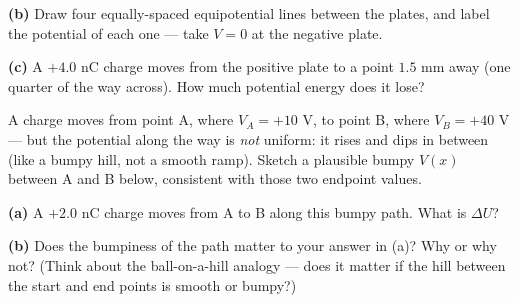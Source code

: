 \documentclass[12pt]{article}
\begin{document}
\textbf{(b)} Draw four equally-spaced equipotential lines between the plates, and
label the potential of each one --- take $V=0$ at the negative plate.

\begin{center}
\end{center}

\textbf{(c)} A $+4.0$ nC charge moves from the positive plate to a point $1.5$ mm
away (one quarter of the way across). How much potential energy does it lose?



\prob A charge moves from point A, where $V_A=+10$ V, to point B, where $V_B=+40$ V
--- but the potential along the way is \emph{not} uniform: it rises and dips in
between (like a bumpy hill, not a smooth ramp). Sketch a plausible bumpy $V(x)$ between
A and B below, consistent with those two endpoint values.

\begin{center}
\end{center}

\textbf{(a)} A $+2.0$ nC charge moves from A to B along this bumpy path. What is
$\Delta U$?


\textbf{(b)} Does the bumpiness of the path matter to your answer in (a)? Why or why
not? (Think about the ball-on-a-hill analogy --- does it matter if the hill between
the start and end points is smooth or bumpy?)
\end{document}
